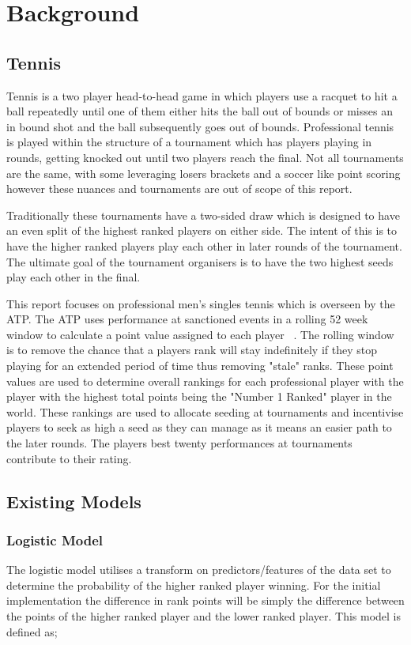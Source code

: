 \documentclass[12pt,a4paper]{article}
\begin{document}
\noindent \hrulefill

\clearpage
\section{Background}

\subsection{Tennis}
Tennis is a two player head-to-head game in which players use a racquet to hit
a ball repeatedly until one of them either hits the ball out of bounds or misses
an in bound shot and the ball subsequently goes out of bounds. Professional tennis
is played within the structure of a tournament which has players playing in rounds,
getting knocked out until two players reach the final. Not all tournaments are
the same, with some leveraging losers brackets and a soccer like point scoring
however these nuances and tournaments are out of scope of this report.

Traditionally these tournaments have a two-sided draw which is designed to have
an even split of the highest ranked players on either side. The intent of this is
to have the higher ranked players play each other in later rounds of the tournament.
The ultimate goal of the tournament organisers is to have the two highest seeds
play each other in the final.

This report focuses on professional men's singles tennis which is overseen by
the ATP. The ATP uses performance at sanctioned events in a rolling 52 week
window to calculate a point value assigned to each player ~\cite{ATPTour2023}.
The rolling window is to remove the chance that a players rank will stay indefinitely
if they stop playing for an extended period of time thus removing "stale" ranks.
These point values are used to determine overall rankings for each professional
player with the player with the highest total points being the "Number 1 Ranked"
player in the world. These rankings are used to allocate seeding at tournaments
and incentivise players to seek as high a seed as they can manage as it means
an easier path to the later rounds. The players best twenty performances at tournaments
contribute to their rating.

\subsection{Existing Models}
\subsubsection{Logistic Model}
The logistic model utilises a transform on predictors/features of the data set to
determine the probability of the higher ranked player winning. For the initial
implementation the difference in rank points will be simply the difference
between the points of the higher ranked player and the lower ranked player. This
model is defined as;
\end{document}
